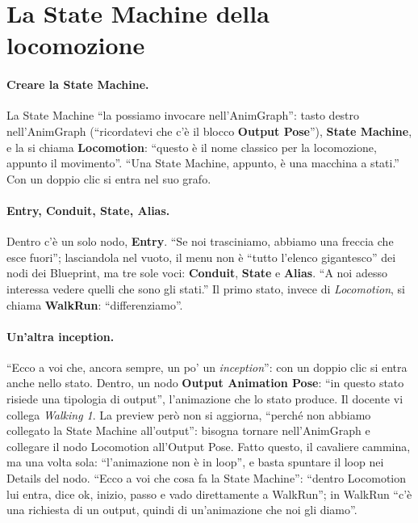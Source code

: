 \section{La State Machine della locomozione}
\label{ue9:sec:statemachine}

\paragraph{Creare la State Machine.} La State Machine ``la possiamo invocare
nell'AnimGraph'': tasto destro nell'AnimGraph (``ricordatevi che c'è il blocco
\textbf{Output Pose}''), \textbf{State Machine}, e la si chiama \textbf{Locomotion}:
``questo è il nome classico per la locomozione, appunto il movimento''. ``Una State
Machine, appunto, è una macchina a stati.'' Con un doppio clic si entra nel suo grafo.

\paragraph{Entry, Conduit, State, Alias.} Dentro c'è un solo nodo, \textbf{Entry}. ``Se
noi trasciniamo, abbiamo una freccia che esce fuori''; lasciandola nel vuoto, il menu non
è ``tutto l'elenco gigantesco'' dei nodi dei Blueprint, ma tre sole voci:
\textbf{Conduit}, \textbf{State} e \textbf{Alias}. ``A noi adesso interessa vedere
quelli che sono gli stati.'' Il primo stato, invece di \emph{Locomotion}, si chiama
\textbf{WalkRun}: ``differenziamo''.

\paragraph{Un'altra inception.} ``Ecco a voi che, ancora sempre, un po' un
\emph{inception}'': con un doppio clic si entra anche nello stato. Dentro, un nodo
\textbf{Output Animation Pose}: ``in questo stato risiede una tipologia di output'',
l'animazione che lo stato produce. Il docente vi collega \emph{Walking 1}. La preview
però non si aggiorna, ``perché non abbiamo collegato la State Machine all'output'':
bisogna tornare nell'AnimGraph e collegare il nodo Locomotion all'Output Pose. Fatto
questo, il cavaliere cammina, ma una volta sola: ``l'animazione non è in loop'', e basta
spuntare il loop nei Details del nodo. ``Ecco a voi che cosa fa la State Machine'':
``dentro Locomotion lui entra, dice ok, inizio, passo e vado direttamente a WalkRun''; in
WalkRun ``c'è una richiesta di un output, quindi di un'animazione che noi gli diamo''.

